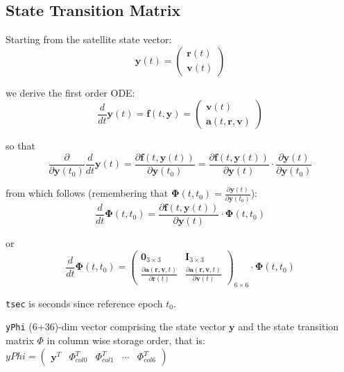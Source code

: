 \subsection{State Transition Matrix}
\label{ssec:ode-state-transition-matrix}
Starting from the satellite state vector:
\begin{equation}
  \bm{y}(t) = \begin{pmatrix} \bm{r}(t) \\ \bm{v}(t) \end{pmatrix}
\end{equation}

we derive the first order ODE:
\begin{equation}
  \frac{d}{dt} \bm{y}(t) = \bm{f}(t, \bm{y}) 
    = \begin{pmatrix} \bm{v}(t) \\ \bm{a}(t,\bm{r}, \bm{v}) \end{pmatrix}
\end{equation}

so that
\begin{equation}
  \frac{\partial}{\partial \bm{y}(t_0)} \frac{d}{dt} \bm{y}(t) = 
  \frac{\partial \bm{f}(t, \bm{y}(t))}{\partial \bm{y}(t_0)} = 
  \frac{\partial \bm{f}(t, \bm{y}(t))}{\partial \bm{y}(t)} \cdot 
  \frac{\partial \bm{y}(t)}{\partial \bm{y}(t_0)}
\end{equation}

from which follows (remembering that $\bm{\Phi}(t,t_0) = \frac{\partial \bm{y}(t)}{\partial \bm{y}(t_0)}$):
\begin{equation}
  \frac{d}{dt} \bm{\Phi}(t,t_0) = 
  \frac{\partial \bm{f}(t, \bm{y}(t))}{\partial \bm{y}(t)} \cdot 
  \bm{\Phi}(t,t_0)
\end{equation}

or
\begin{equation}
  \frac{d}{dt} \bm{\Phi}(t,t_0) = \begin{pmatrix}
    \bm{0}_{3 \times 3} & \bm{I}_{3 \times 3} \\
    \frac{\partial \bm{a}(\bm{r}, \bm{v}, t)}{\partial \bm{r}(t)} & 
    \frac{\partial \bm{a}(\bm{r}, \bm{v}, t)}{\partial \bm{v}(t)}
  \end{pmatrix}_{6 \times 6} \cdot \bm{\Phi}(t,t_0)
\end{equation}


\texttt{tsec} is seconds since reference epoch $t_0$.

\texttt{yPhi} (6+36)-dim vector comprising the state vector $\bm{y}$ and the
state transition matrix $\Phi$ in column wise storage order, that is:
$yPhi = \begin{pmatrix}
    \bm{y}^T &  \Phi ^T _{col0} & \Phi ^T _{col1} & \cdots & \Phi^T _{col6}
\end{pmatrix}$

